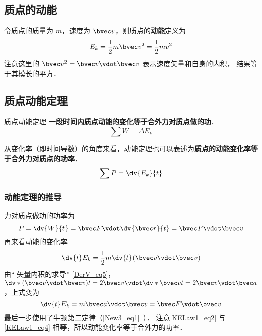 
\subsection{质点的动能}
令质点的质量为 $m$，速度为 $\bvec v$，则质点的\textbf{动能}定义为
\begin{equation}
E_k = \frac12 m\bvec v^2 = \frac12 mv^2
\end{equation}
注意这里的 $\bvec v^2 = \bvec v \vdot \bvec v$ 表示速度矢量和自身的内积， 结果等于其模长的平方．

\subsection{质点动能定理}
\begin{theorem}{质点动能定理}
\textbf{一段时间内质点动能的变化等于合外力对质点做的功}．
\begin{equation}
\sum W=\Delta E_k
\end{equation}

从变化率（即时间导数）的角度来看，动能定理也可以表述为\textbf{质点的动能变化率等于合外力对质点的功率}．
\begin{equation}
\sum P=\dv{E_k}{t}
\end{equation}
\end{theorem}

\subsubsection{动能定理的推导}
力对质点做功的功率为
\begin{equation}\label{KELaw1_eq2}
P = \dv{W}{t} =  \bvec F\vdot \dv{\bvec r}{t} = \bvec F\vdot\bvec v
\end{equation}
再来看动能的变化率
\begin{equation}
\dv{t} E_k = \frac12 m\dv{t} (\bvec v\vdot\bvec v)
\end{equation}
由“ 矢量内积的求导” \autoref{DerV_eq5}，$\dv*{(\bvec v\vdot\bvec v)}{t} = 2\bvec v\vdot \dv*{\bvec v}{t} = 2\bvec v\vdot\bvec a$，上式变为
\begin{equation}\label{KELaw1_eq4}
\dv{t} E_k = m\bvec a\vdot\bvec v = \bvec F\vdot\bvec v
\end{equation}
最后一步使用了牛顿第二定律（\autoref{New3_eq1}~）． 注意\autoref{KELaw1_eq2} 与\autoref{KELaw1_eq4} 相等，所以动能变化率等于合外力的功率．